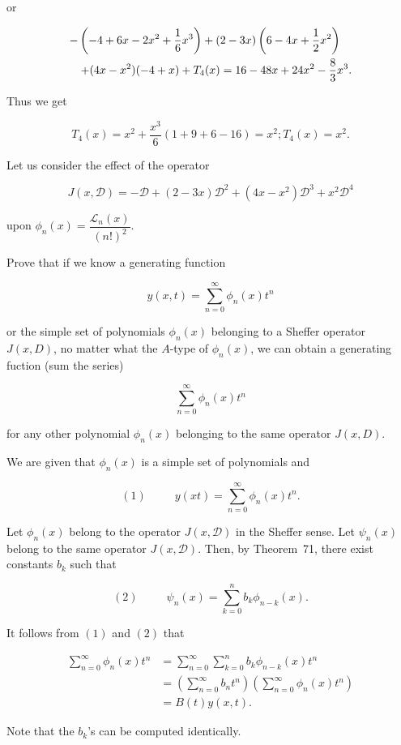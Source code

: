 \begin{solution}
or

\begin{eqnarray*}
\lefteqn{-\left(-4+6x-2x^2+\dfrac{1}{6}x^3 \right)+(2-3x)\left(6-4x+\dfrac{1}{2}x^2 \right)} \\
& & + (4x-x^2)(-4+x) + T_4(x) = 16 -48x + 24x^2 - \dfrac{8}{3}x^3.
\end{eqnarray*}

Thus we get

$$T_4(x) = x^2 + \dfrac{x^3}{6}(1+9+6-16) = x^2; T_4(x) = x^2.$$

Let us consider the effect of the operator

$$J(x,\mathscr{D}) = -\mathscr{D} + (2-3x)\mathscr{D}^2 + (4x-x^2)\mathscr{D}^3+x^2\mathscr{D}^4$$

upon $\phi_n(x) = \dfrac{\mathscr{L}_n(x)}{(n!)^2}.$
\end{solution}
\begin{problem}\label{problem8chapter13}
Prove that if we know a generating function

$$y(x,t) = \displaystyle\sum_{n=0}^{\infty} \phi_n(x) t^n$$

or the simple set of polynomials $\phi_n(x)$ belonging to a Sheffer operator $J(x,D)$, no matter what the $A$-type of $\phi_n(x)$, we can obtain a generating fuction (sum the series)

$$\displaystyle\sum_{n=0}^{\infty} \phi_n(x) t^n$$

for any other polynomial $\phi_n(x)$ belonging to the same operator $J(x,D)$.
\end{problem}
\begin{solution}
We are given that $\phi_n(x)$ is a simple set of polynomials and

$$(1) \hspace{30pt} y(xt) = \displaystyle\sum_{n=0}^{\infty} \phi_n(x) t^n.$$

Let $\phi_n(x)$ belong to the operator $J(x,\mathscr{D})$ in the Sheffer sense. Let $\psi_n(x)$ belong to the same operator $J(x,\mathscr{D})$. Then, by Theorem~71, there exist constants $b_k$ such that

$$(2) \hspace{30pt} \psi_n(x) = \displaystyle\sum_{k=0}^n b_k \phi_{n-k}(x).$$

It follows from $(1)$ and $(2)$ that

$$\begin{array}{ll}
\displaystyle\sum_{n=0}^{\infty} \phi_n(x) t^n &= \displaystyle\sum_{n=0}^{\infty} \displaystyle\sum_{k=0}^{n} b_k \phi_{n-k}(x) t^n \\
&= \left( \displaystyle\sum_{n=0}^{\infty} b_n t^n \right) \left( \displaystyle\sum_{n=0}^{\infty} \phi_n(x) t^n \right) \\
&= B(t) y(x,t).
\end{array}$$

Note that the $b_k$'s can be computed identically.
\end{solution}
